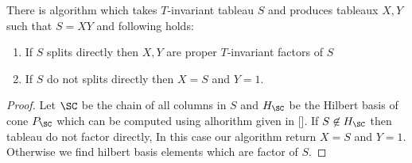 \begin{corollary}
    There is algorithm which takes \(T\)-invariant tableau \(S\) and produces tableaux \(X,Y\) 
    such that \(S=XY\) and following holds:
    \begin{enumerate}
        \item If \(S\) splits directly then \(X,Y\) are proper \(T\)-invariant factors of \(S\)
        \item If \(S\) do not splits directly then \(X=S\) and \(Y=1\).
    \end{enumerate}
\end{corollary}
\begin{proof}
    Let \(\SC\) be the chain of all columns in \(S\) and \(H_{\SC}\) be the Hilbert basis of cone \(P_{\SC}\) which can be computed using alhorithm given in []. If \(S\not\in H_{\SC}\) then tableau do not factor directly, In this case our algorithm return \(X=S\) and \(Y=1\). Otherwise we find hilbert basis elements which are factor of \(S\). 
\end{proof}


